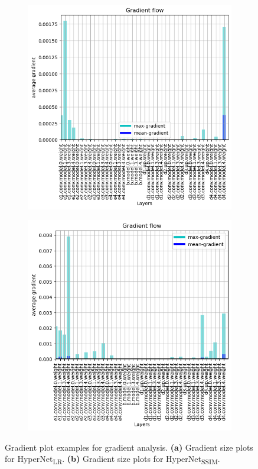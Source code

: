 \documentclass{article}
\begin{document}
\begin{figure}[!htb]
    \centering
    \begin{subfigure}[b]{0.48\textwidth}
        \centering
        \includegraphics[width=\textwidth]{figs/ClassicUnet_LR/grads/grads999.png}
        \caption{}
        \label{fig:UnetLR_grads}
    \end{subfigure}
    \hfill
    \begin{subfigure}[b]{0.48\textwidth}
        \centering
        \includegraphics[width=\textwidth]{figs/ClassicUnetSSIM_LR/grads/grads999.png}
        \caption{}
        \label{fig:UnetSSIM_grads}
    \end{subfigure}

    \label{fig:grads_all}
    \caption{Gradient plot examples for gradient analysis. \textbf{(a)} Gradient size plots for HyperNet\textsubscript{LR}. \textbf{(b)} Gradient size plots for HyperNet\textsubscript{SSIM}.}
    
\end{figure}
\end{document}
